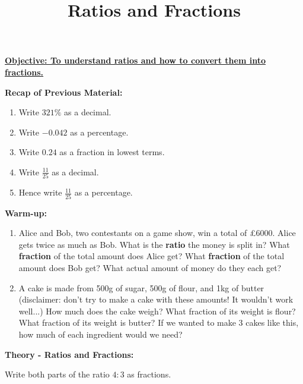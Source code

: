 \documentclass{article}
\begin{document}
\title{Ratios and Fractions}
\date{}

\maketitle
\thispagestyle{empty}

\Large

\textbf{\underline{Objective: To understand ratios and how to convert them into fractions.}}

\vspace{5mm}

\textbf{Recap of Previous Material:}

\vspace{5mm}

\begin{enumerate}
\item Write $321\%$ as a decimal.
\item Write $-0.042$ as a percentage.
\item Write $0.24$ as a fraction in lowest terms.
\item Write $\frac{11}{25}$ as a decimal.
\item Hence write $\frac{11}{25}$ as a percentage.
\end{enumerate}

\clearpage


\textbf{Warm-up:}

\begin{enumerate}
\item Alice and Bob, two contestants on a game show, win a total of \pounds 6000. Alice gets twice as much as Bob. What is the \textbf{ratio} the money is split in? What \textbf{fraction} of the total amount does Alice get? What \textbf{fraction} of the total amount does Bob get? What actual amount of money do they each get?
\item A cake is made from 500g of sugar, 500g of flour, and 1kg of butter (disclaimer: don't try to make a cake with these amounts! It wouldn't work well...) How much does the cake weigh? What fraction of its weight is flour? What fraction of its weight is butter? If we wanted to make 3 cakes like this, how much of each ingredient would we need? 
\end{enumerate}




\clearpage


{\bf Theory - Ratios and Fractions:}

Write both parts of the ratio $4:3$ as fractions.
\end{document}
